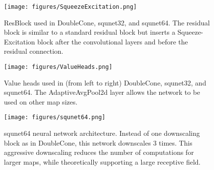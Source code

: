 \documentclass{article}
\begin{document}
\begin{figure}[H]
    \begin{center}
        \texttt{[image: figures/SqueezeExcitation.png]}
    \end{center}
    \caption{ResBlock used in DoubleCone, squnet32, and squnet64. The residual block is similar to a standard residual block but inserts a Squeeze-Excitation block after the convolutional layers and before the residual connection.}
    \label{fig:squeezeexcitation}
\end{figure}

\begin{figure}[H]
    \begin{center}
        \texttt{[image: figures/ValueHeads.png]}
    \end{center}
    \caption{Value heads used in (from left to right) DoubleCone, squnet32, and
    squnet64. The AdaptiveAvgPool2d layer allows the network to be used on other map
    sizes.}
    \label{fig:valueheads}
\end{figure}

\begin{figure}[H]
    \begin{center}
        \texttt{[image: figures/squnet64.png]}
    \end{center}
    \caption{squnet64 neural network architecture. Instead of one downscaling block as in DoubleCone, this network downscales 3 times. This aggressive downscaling reduces the number of computations for larger maps, while theoretically supporting a large receptive field.}
    \label{fig:squnet}
\end{figure}
        
\end{document}
